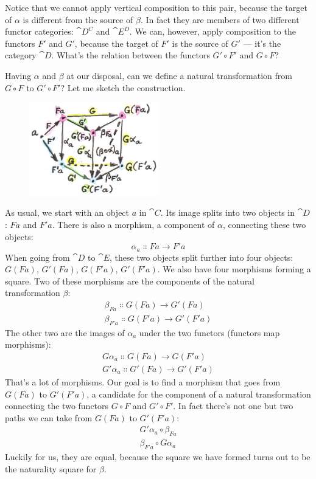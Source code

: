 \noindent
Notice that we cannot apply vertical composition to this pair, because
the target of $\alpha$ is different from the source of $\beta$. In fact they are
members of two different functor categories: $\cat{D^C}$ and $\cat{E^D}$.
We can, however, apply composition to the functors
$F'$ and $G'$, because the target of $F'$ is the source of $G'$ --- it's the
category $\cat{D}$. What's the relation between the functors $G' \circ F'$ and $G \circ F$?

Having $\alpha$ and $\beta$ at our disposal, can we define a natural transformation
from $G \circ F$ to $G' \circ F'$? Let me sketch the construction.

\begin{figure}[H]
\centering
\includegraphics[width=0.5\textwidth]{images/9_horizontal.jpg}
\end{figure}

\noindent
As usual, we start with an object $a$ in $\cat{C}$. Its image splits into
two objects in $\cat{D}$: $F a$ and $F'a$. There is also a
morphism, a component of $\alpha$, connecting these two objects:
\[\alpha_a \Colon F a \to F'a\]
When going from $\cat{D}$ to $\cat{E}$, these two objects split further into four
objects: $G (F a)$, $G'(F a)$, $G (F'a)$, $G'(F'a)$.
We also have four morphisms forming a square. Two of these morphisms are
the components of the natural transformation $\beta$:
\begin{gather*}
\beta_{F a} \Colon G (F a) \to G'(F a) \\
\beta_{F'a} \Colon G (F'a) \to G'(F'a)
\end{gather*}
The other two are the images of $\alpha_a$ under the two
functors (functors map morphisms):
\begin{gather*}
G \alpha_a \Colon G (F a) \to G (F'a) \\
G'\alpha_a \Colon G'(F a) \to G'(F'a)
\end{gather*}
That's a lot of morphisms. Our goal is to find a morphism that goes from
$G (F a)$ to $G'(F'a)$, a candidate for the
component of a natural transformation connecting the two functors $G \circ F$
and $G' \circ F'$. In fact there's not one but two paths we can take from
$G (F a)$ to $G'(F'a)$:
\begin{gather*}
G'\alpha_a \circ \beta_{F a} \\
\beta_{F'a} \circ G \alpha_a
\end{gather*}
Luckily for us, they are equal, because the square we have formed turns
out to be the naturality square for $\beta$.

